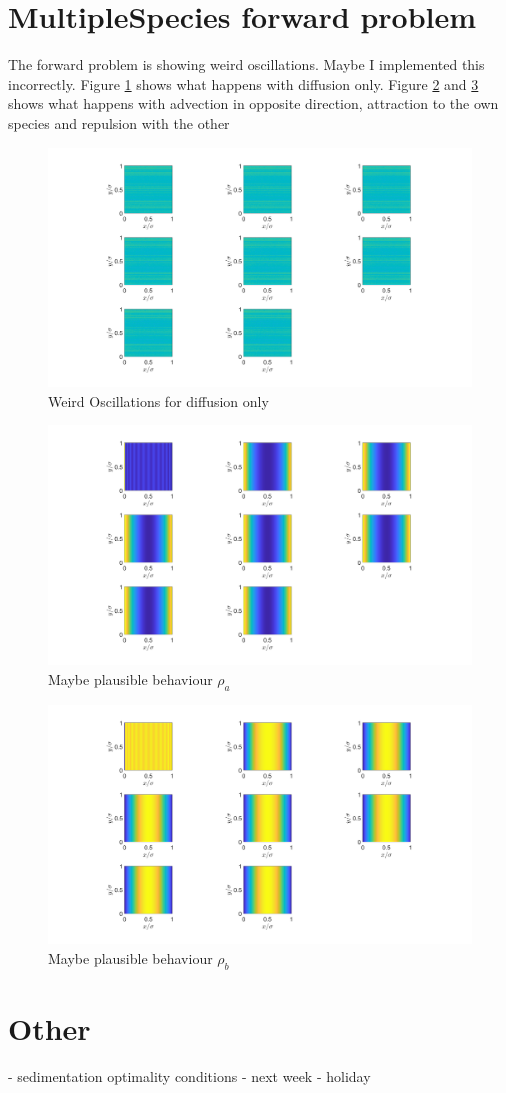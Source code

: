 \documentclass[11pt, a4paper]{article}
\theoremstyle{definition}
\begin{document}
\section{MultipleSpecies forward problem}
	The forward problem is showing weird oscillations. Maybe I implemented this incorrectly. Figure \ref{F7} shows what happens with diffusion only. Figure \ref{F8} and \ref{F9} shows what happens with advection in opposite direction, attraction to the own species and repulsion with the other
	\begin{figure}[h]
		\centering
		\includegraphics[scale=0.25]{Weird.png}
		\caption{Weird Oscillations for diffusion only} 
		\label{F7}
	\end{figure}
	\begin{figure}[h]
		\centering
		\includegraphics[scale=0.25]{Cool1.png}
		\caption{Maybe plausible behaviour $\rho_a$} 
		\label{F8}
	\end{figure}
\begin{figure}[h]
	\centering
	\includegraphics[scale=0.25]{Cool2.png}
	\caption{Maybe plausible behaviour $\rho_b$} 
	\label{F9}
\end{figure}

\section{Other}
- sedimentation optimality conditions
- next week
- holiday
\end{document}
